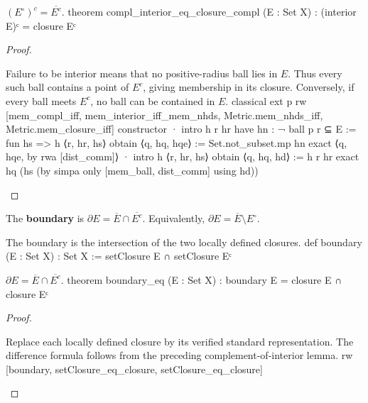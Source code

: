 \begin{lemma} \label{an1:lem:complement-of-interior-is-closure-of-complement}
  \begin{lean}{$(E^{\circ})^{c}=\overline{E^{c}}$.}
    theorem compl_interior_eq_closure_compl (E : Set X) :
        (interior E)ᶜ = closure Eᶜ
  \end{lean}
\end{lemma}

\begin{proof}
  \begin{lean}{Failure to be interior means that no positive-radius ball lies in $E$. Thus every such ball contains a point of $E^{c}$, giving membership in its closure. Conversely, if every ball meets $E^{c}$, no ball can be contained in $E$.}
    classical
    ext p
    rw [mem_compl_iff, mem_interior_iff_mem_nhds, Metric.mem_nhds_iff,
      Metric.mem_closure_iff]
    constructor
    · intro h r hr
      have hn : ¬ ball p r ⊆ E := fun hs => h ⟨r, hr, hs⟩
      obtain ⟨q, hq, hqe⟩ := Set.not_subset.mp hn
      exact ⟨q, hqe, by rwa [dist_comm]⟩
    · intro h ⟨r, hr, hs⟩
      obtain ⟨q, hq, hd⟩ := h r hr
      exact hq (hs (by simpa only [mem_ball, dist_comm] using hd))
  \end{lean}

\end{proof}

\begin{definition} \label{an1:def:boundary}
  The \textbf{boundary} is $\partial E=\overline E\cap\overline{E^{c}}$.
  Equivalently, $\partial E=\overline E\setminus E^{\circ}$.
  \begin{lean}{The boundary is the intersection of the two locally defined closures.}
    def boundary (E : Set X) : Set X := setClosure E ∩ setClosure Eᶜ
  \end{lean}
\end{definition}

\begin{lemma} \label{an1:lem:boundary-eq}
  \begin{lean}{$\partial E=\overline E\cap\overline{E^{c}}$.}
    theorem boundary_eq (E : Set X) :
        boundary E = closure E ∩ closure Eᶜ
  \end{lean}
\end{lemma}

\begin{proof}
  \begin{lean}{Replace each locally defined closure by its verified standard representation. The difference formula follows from the preceding complement-of-interior lemma.}
    rw [boundary, setClosure_eq_closure, setClosure_eq_closure]
  \end{lean}

\end{proof}

